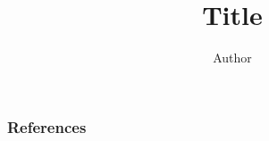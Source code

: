 \documentclass[notheorems,notes]{beamer}
\title{Title}
\author{Author}
\institute{Institute}
\date{}
\theoremstyle{definition}
\begin{document}
\titlepage
\begin{frame}
    \nocite{*}
    \frametitle{References}
    
    
    \end{frame}
\end{document}
